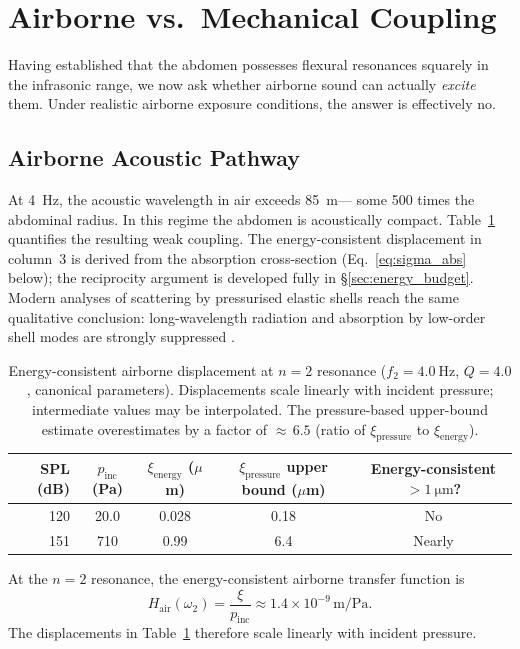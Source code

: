\section{Airborne vs.\ Mechanical Coupling}\label{sec:coupling}

Having established that the abdomen possesses flexural resonances squarely
in the infrasonic range, we now ask whether airborne sound can
actually \emph{excite} them.  Under realistic airborne
exposure conditions, the answer is effectively no.

\subsection{Airborne Acoustic Pathway}

At \SI{4}{\hertz}, the acoustic wavelength in air exceeds \SI{85}{\metre}---
some 500 times the abdominal radius.  In this regime the abdomen is
acoustically compact.  Table~\ref{tab:airborne} quantifies the resulting weak
coupling.  The energy-consistent displacement in column~3 is derived from the
absorption cross-section (Eq.~\ref{eq:sigma_abs} below); the reciprocity
argument is developed fully in \S\ref{sec:energy_budget}.  Modern analyses of
scattering by pressurised elastic shells reach the same qualitative
conclusion: long-wavelength radiation and absorption by low-order shell modes
are strongly suppressed \cite{Godin2023}.

\begin{table}[htbp]
  \centering
  \caption{Energy-consistent airborne displacement at $n=2$ resonance
  ($f_2 = \SI{4.0}{\hertz}$, $Q = 4.0$, canonical parameters).
  Displacements scale linearly with incident pressure; intermediate values may
  be interpolated.  The pressure-based upper-bound estimate overestimates by a
  factor of ${\approx}\,6.5$ (ratio of $\xi_\mathrm{pressure}$ to
  $\xi_\mathrm{energy}$).}
  \label{tab:airborne}
  \begin{tabular}{rcccc}
    \toprule
    SPL (dB) & $p_\mathrm{inc}$ (Pa) &
    $\xi_\mathrm{energy}$ ($\mu$m) &
    $\xi_\mathrm{pressure}$ upper bound ($\mu$m) & Energy-consistent $>\SI{1}{\micro\metre}$? \\
    \midrule
    120 & 20.0 & 0.028 & 0.18  & No \\
    151 & 710  & 0.99  & 6.4   & Nearly \\
    \bottomrule
  \end{tabular}
\end{table}

At the $n = 2$ resonance, the energy-consistent airborne transfer function is
\begin{equation}
  H_\mathrm{air}(\omega_2)
  = \frac{\xi}{p_\mathrm{inc}}
  \approx 1.4 \times 10^{-9}\,\si{\metre\per\pascal}.
  \label{eq:H_air}
\end{equation}
The displacements in Table~\ref{tab:airborne} therefore scale linearly with
incident pressure.

